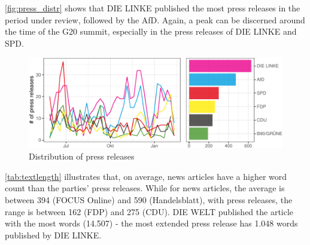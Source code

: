 \documentclass[
  12pt,
]{article}
\begin{document}
\autoref{fig:press_distr} shows that DIE LINKE published the most press
releases in the period under review, followed by the AfD. Again, a peak
can be discerned around the time of the G20 summit, especially in the
press releases of DIE LINKE and SPD.

\begin{figure}

{\centering \includegraphics[width=0.8\linewidth]{chap1_files/figure-latex/Distribution of press releases-1} 

}

\caption{Distribution of press releases \label{fig:press_distr}}\label{fig:Distribution of press releases}
\end{figure}

\autoref{tab:textlength} illustrates that, on average, news articles
have a higher word count than the parties' press releases. While for
news articles, the average is between 394 (FOCUS Online) and 590
(Handelsblatt), with press releases, the range is between 162 (FDP) and
275 (CDU). DIE WELT published the article with the most words (14.507) -
the most extended press release has 1.048 words published by DIE LINKE.
\end{document}
